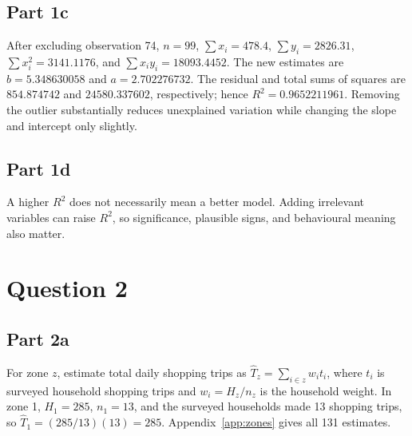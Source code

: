 \documentclass[11pt]{article}
\begin{document}
\subsection{Part 1c}
After excluding observation 74, $n=99$, $\sum x_i=478.4$, $\sum y_i=2826.31$, $\sum x_i^2=3141.1176$, and $\sum x_iy_i=18093.4452$. The new estimates are $b=5.348630058$ and $a=2.702276732$. The residual and total sums of squares are $854.874742$ and $24580.337602$, respectively; hence $R^2=0.9652211961$. Removing the outlier substantially reduces unexplained variation while changing the slope and intercept only slightly.
\subsection{Part 1d}
A higher $R^2$ does not necessarily mean a better model. Adding irrelevant variables can raise $R^2$, so significance, plausible signs, and behavioural meaning also matter.
\newpage
\section{Question 2}
\subsection{Part 2a}
For zone $z$, estimate total daily shopping trips as $\hat T_z=\sum_{i\in z}w_i t_i$, where $t_i$ is surveyed household shopping trips and $w_i=H_z/n_z$ is the household weight. In zone 1, $H_1=285$, $n_1=13$, and the surveyed households made 13 shopping trips, so $\hat T_1=(285/13)(13)=285$. Appendix~\ref{app:zones} gives all 131 estimates.
\end{document}
